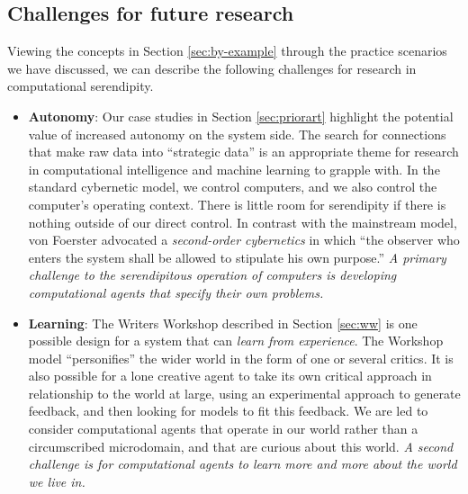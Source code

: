 \subsection{Challenges for future research} \label{sec:recommendations}

Viewing the concepts in Section \ref{sec:by-example} through the
practice scenarios we have discussed, we can describe the following
challenges for research in computational serendipity.

\begin{itemize}
\item \textbf{Autonomy}: Our case studies in Section \ref{sec:priorart} highlight the potential value of increased autonomy on the system side.
The search for connections that make raw data into ``strategic data''
is an appropriate theme for research in computational intelligence and
machine learning to grapple with.  In the standard cybernetic model,
we control computers, and we also control the computer's operating
context.  There is little room for serendipity if there is nothing
outside of our direct control.  In contrast with the mainstream model,
von Foerster \citeyear[p. 286]{von2003cybernetics} advocated a
\emph{second-order cybernetics} in which ``the observer who enters the
system shall be allowed to stipulate his own purpose.''  \emph{A
  primary challenge to the serendipitous operation of computers is
  developing computational agents that specify their own problems.}
\end{itemize}

\begin{itemize}
\item \textbf{Learning}: The Writers Workshop described in Section
  \ref{sec:ww} is one possible design for a system
  that can \emph{learn from experience}.  The Workshop model
  ``personifies'' the wider world in the form of one or several
  critics.  It is also possible for a lone creative agent to
  take its own critical approach in relationship to the world at
  large, using an experimental approach to generate feedback, and then
  looking for models to fit this feedback.   We are led to consider 
  computational agents that operate in our world rather
  than a circumscribed microdomain, and that are curious about this
  world.  \emph{A second challenge is for computational agents to
    learn more and more about the world we live in.}
\end{itemize}

